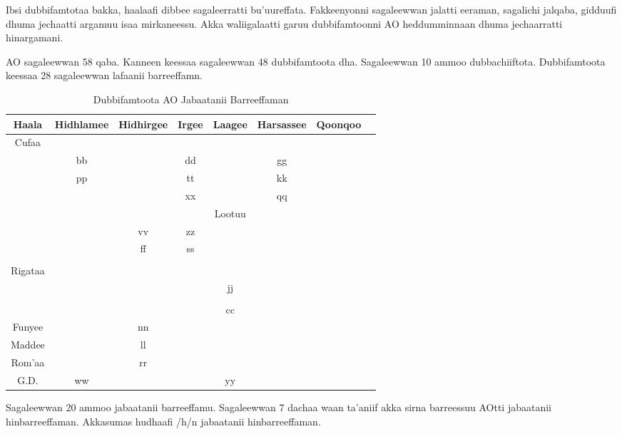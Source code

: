\documentclass[11pt,b5paper]{book}
\begin{document}
Ibsi dubbifamtotaa bakka, haalaafi dibbee sagaleerratti  bu’uureffata. Fakkeenyonni sagaleewwan jalatti eeraman,  sagalichi jalqaba, gidduufi dhuma jechaatti argamuu isaa  mirkaneessu. Akka waliigalaatti garuu dubbifamtoonni AO  heddumminnaan dhuma jechaarratti hinargamani. 

AO sagaleewwan 58 qaba. Kanneen keessaa sagaleewwan 48 dubbifamtoota dha. Sagaleewwan 10 ammoo dubbachiiftota. Dubbifamtoota keessaa 28 sagaleewwan lafaanii barreeffamn. 

\begin{table}[H]
	\centering
	\caption{Dubbifamtoota AO Jabaatanii Barreeffaman}
	\begin{tabular}{c |c c c c c c c}
		\hline
		Haala & Hidhlamee & Hidhirgee & Irgee & Laagee & Harsassee & Qoonqoo \\
		\hline
		Cufaa \\
		 & bb & & dd & & gg & & \\
		 & pp & & tt & & kk & & \\
		 & & & xx & & qq & & \\
		 & & & &\cr
		\hline
		Lootuu \\
		 & & vv & zz & & \\
		 &  & ff & ss & & & &  \\
		 & & & &\\
		\hline
		Rigataa \\
		 & & & & jj \\
		 & & & & &\\
		 & & & & cc\\
		\hline
		Funyee & & nn \\
		\hline
		Maddee & & ll\\
		\hline
		Rom'aa & & rr\\
		\hline
		G.D. & ww & & & yy\\
		\hline		
	\end{tabular}
\end{table}

Sagaleewwan 20 ammoo jabaatanii barreeffamu. Sagaleewwan 7 dachaa waan ta'aniif akka sirna barreessuu AOtti jabaatanii hinbarreeffaman. Akkasumas hudhaafi /h/n jabaatanii hinbarreeffaman.
\end{document}
